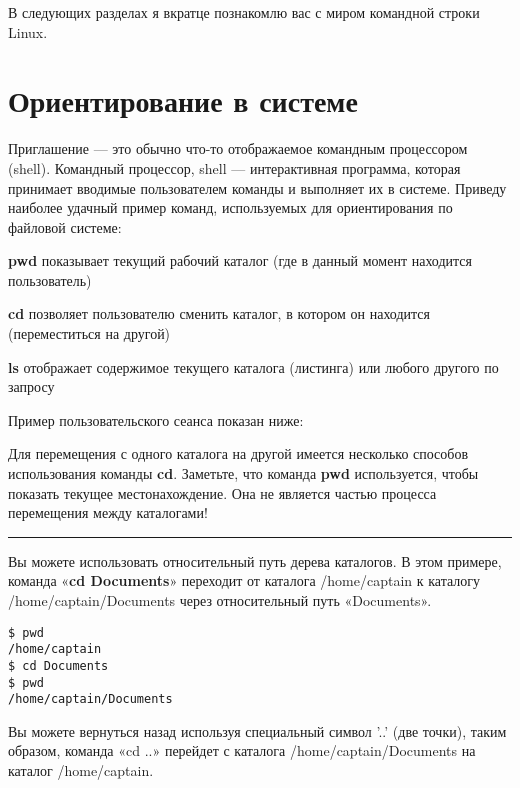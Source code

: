 \documentclass[12pt]{book}
\begin{document}
В следующих разделах я вкратце познакомлю вас с миром командной строки Linux.

\section{Ориентирование в системе}

Приглашение — это обычно что-то отображаемое командным процессором (shell). Командный процессор, shell — интерактивная программа, которая принимает вводимые пользователем команды и выполняет их в системе. Приведу наиболее удачный пример команд, используемых для ориентирования по файловой системе:

\begin{description}
	\item \textbf{pwd} показывает текущий рабочий каталог (где в данный момент находится пользователь)
	\item \textbf{cd} позволяет пользователю сменить каталог, в котором он находится (переместиться на другой)
	\item \textbf{ls} отображает содержимое текущего каталога (листинга) или любого другого по запросу
\end{description}

Пример пользовательского сеанса показан ниже:

\vspace{3mm}


Для перемещения с одного каталога на другой имеется несколько способов использования команды \textbf{cd}. Заметьте, что команда \textbf{pwd} используется, чтобы показать текущее местонахождение. Она не является частью процесса перемещения между каталогами!

\phantom{}
\hrule{}
\phantom{}

Вы можете использовать относительный путь дерева каталогов. В этом примере, команда «\textbf{cd Documents}» переходит от каталога /home/captain к каталогу /home/captain/Documents через относительный путь «Documents».

\vspace{3mm}
\begin{tcolorbox}
\begin{lstlisting}
$ pwd
/home/captain
$ cd Documents
$ pwd
/home/captain/Documents
\end{lstlisting}
\end{tcolorbox}

Вы можете вернуться назад используя специальный символ '..' (две точки), таким образом, команда «cd ..» перейдет с каталога /home/captain/Documents на  каталог /home/captain.
\end{document}
